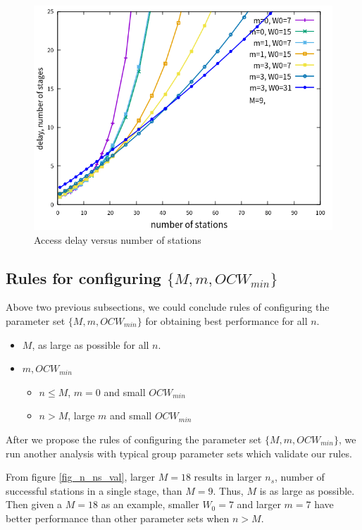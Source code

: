 \begin{figure}[!ht]
\includegraphics[scale=.54]{./figure/n_delay_perf.png}
\caption{Access delay versus number of stations}
\label{fig_n_delay}
\end{figure}




\subsection{Rules for configuring $\lbrace M,m,OCW_{min} \rbrace$}
Above two previous subsections, we could conclude rules of configuring the parameter set $\lbrace M, m, OCW_{min} \rbrace$ for obtaining best performance for all $n$. 
\begin{itemize}
\item $M$, as large as possible for all $n$.
\item $m, OCW_{min}$
	\begin{itemize}
	\item $n \leq M$, $m = 0$ and small $OCW_{min}$ 
	\item $n > M$, large $m$ and small $OCW_{min}$
	\end{itemize}
\end{itemize}

After we propose the rules of configuring the parameter set $\lbrace M, m, OCW_{min} \rbrace$, we run another analysis with typical group parameter sets which validate our rules.

From figure \ref{fig_n_ns_val}, larger $M = 18$  results in larger $n_s$, number of successful stations in a single stage, than $M=9$. Thus, $M$ is as large as possible.
Then given a $M=18$ as an example, smaller $W_0 = 7$ and larger $m = 7$ have better performance than other parameter sets when $n>M$.

